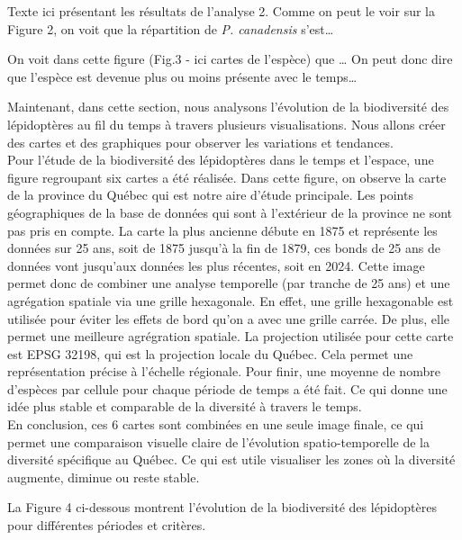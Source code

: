 \documentclass[9pt,twocolumn,twoside,]{pnas-new}
\begin{document}
Texte ici présentant les résultats de l'analyse 2. Comme on peut le voir
sur la Figure 2, on voit que la répartition de \emph{P. canadensis}
s'est\ldots{}

On voit dans cette figure (Fig.3 - ici cartes de l'espèce) que \ldots{}
On peut donc dire que l'espèce est devenue plus ou moins présente avec
le temps\ldots{}

Maintenant, dans cette section, nous analysons l'évolution de la
biodiversité des lépidoptères au fil du temps à travers plusieurs
visualisations. Nous allons créer des cartes et des graphiques pour
observer les variations et tendances.\\
Pour l'étude de la biodiversité des lépidoptères dans le temps et
l'espace, une figure regroupant six cartes a été réalisée. Dans cette
figure, on observe la carte de la province du Québec qui est notre aire
d'étude principale. Les points géographiques de la base de données qui
sont à l'extérieur de la province ne sont pas pris en compte. La carte
la plus ancienne débute en 1875 et représente les données sur 25 ans,
soit de 1875 jusqu'à la fin de 1879, ces bonds de 25 ans de données vont
jusqu'aux données les plus récentes, soit en 2024. Cette image permet
donc de combiner une analyse temporelle (par tranche de 25 ans) et une
agrégation spatiale via une grille hexagonale. En effet, une grille
hexagonable est utilisée pour éviter les effets de bord qu'on a avec une
grille carrée. De plus, elle permet une meilleure agrégration spatiale.
La projection utilisée pour cette carte est EPSG 32198, qui est la
projection locale du Québec. Cela permet une représentation précise à
l'échelle régionale. Pour finir, une moyenne de nombre d'espèces par
cellule pour chaque période de temps a été fait. Ce qui donne une idée
plus stable et comparable de la diversité à travers le temps.\\
En conclusion, ces 6 cartes sont combinées en une seule image finale, ce
qui permet une comparaison visuelle claire de l'évolution
spatio-temporelle de la diversité spécifique au Québec. Ce qui est utile
visualiser les zones où la diversité augmente, diminue ou reste stable.

La Figure 4 ci-dessous montrent l'évolution de la biodiversité des
lépidoptères pour différentes périodes et critères.
\end{document}
